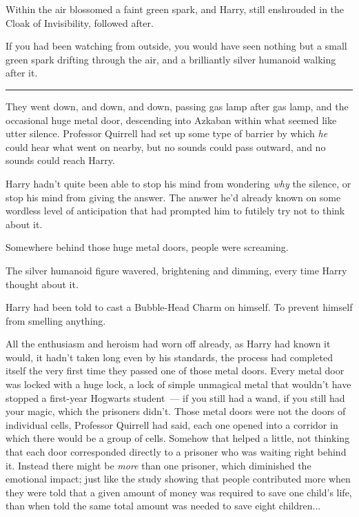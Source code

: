Within the air blossomed a faint green spark, and Harry, still enshrouded in the Cloak of Invisibility, followed after.

If you had been watching from outside, you would have seen nothing but a small green spark drifting through the air, and a brilliantly silver humanoid walking after it.

\begin{center}\rule{3in}{0.4pt}\end{center}

They went down, and down, and down, passing gas lamp after gas lamp, and the occasional huge metal door, descending into Azkaban within what seemed like utter silence. Professor Quirrell had set up some type of barrier by which \emph{he} could hear what went on nearby, but no sounds could pass outward, and no sounds could reach Harry.

Harry hadn't quite been able to stop his mind from wondering \emph{why} the silence, or stop his mind from giving the answer. The answer he'd already known on some wordless level of anticipation that had prompted him to futilely try not to think about it.

Somewhere behind those huge metal doors, people were screaming.

The silver humanoid figure wavered, brightening and dimming, every time Harry thought about it.

Harry had been told to cast a Bubble-Head Charm on himself. To prevent himself from smelling anything.

All the enthusiasm and heroism had worn off already, as Harry had known it would, it hadn't taken long even by his standards, the process had completed itself the very first time they passed one of those metal doors. Every metal door was locked with a huge lock, a lock of simple unmagical metal that wouldn't have stopped a first-year Hogwarts student~--- if you still had a wand, if you still had your magic, which the prisoners didn't. Those metal doors were not the doors of individual cells, Professor Quirrell had said, each one opened into a corridor in which there would be a group of cells. Somehow that helped a little, not thinking that each door corresponded directly to a prisoner who was waiting right behind it. Instead there might be \emph{more} than one prisoner, which diminished the emotional impact; just like the study showing that people contributed more when they were told that a given amount of money was required to save one child's life, than when told the same total amount was needed to save eight children...

